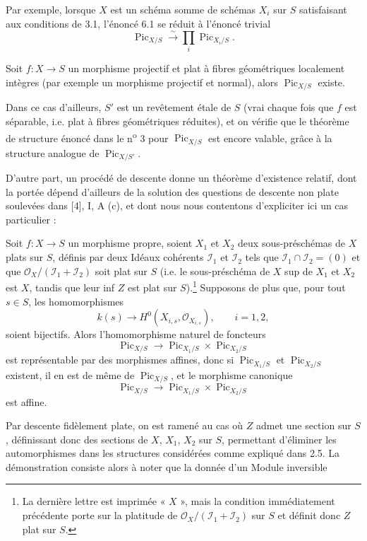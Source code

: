 Par exemple, lorsque $X$ est un schéma somme de schémas $X_i$ sur $S$
satisfaisant aux conditions de 3.1, l'énoncé 6.1 se réduit à l'énoncé trivial
\[
\operatorname{Pic}_{X/S}\xrightarrow{\sim}
\prod_i\operatorname{Pic}_{X_i/S}.
\]

 Soit $f:X\longrightarrow S$ un morphisme projectif et
plat à fibres géométriques localement intègres (par exemple un morphisme
projectif et normal), alors $\operatorname{Pic}_{X/S}$ existe.

Dans ce cas d'ailleurs, $S'$ est un revêtement étale de $S$ (vrai chaque fois
que $f$ est séparable, i.e. plat à fibres géométriques réduites), et on vérifie
que le théorème de structure énoncé dans le n\textsuperscript{o} 3 pour
$\operatorname{Pic}_{X/S}$ est encore valable, grâce à la structure analogue
de $\operatorname{Pic}_{X/S'}$.

D'autre part, un procédé de descente donne un théorème d'existence relatif,
dont la portée dépend d'ailleurs de la solution des questions de descente non
plate soulevées dans [4], I, A (c), et dont nous nous contentons d'expliciter
ici un cas particulier :

 Soit $f:X\longrightarrow S$ un morphisme propre,
soient $X_1$ et $X_2$ deux sous-préschémas de $X$ plats sur $S$, définis par
deux Idéaux cohérents $\mathcal I_1$ et $\mathcal I_2$ tels que
$\mathcal I_1\cap\mathcal I_2=(0)$ et que
$\mathcal O_X/(\mathcal I_1+\mathcal I_2)$ soit plat sur $S$ (i.e. le
sous-préschéma de $X$ sup de $X_1$ et $X_2$ est $X$, tandis que leur inf $Z$
est plat sur $S$).\footnote{La dernière lettre est imprimée « $X$ », mais la
condition immédiatement précédente porte sur la platitude de
$\mathcal O_X/(\mathcal I_1+\mathcal I_2)$ sur $S$ et définit donc $Z$ plat
sur $S$.} Supposons de plus que, pour tout $s\in S$, les homomorphismes
\[
k(s)\longrightarrow H^0(X_{i,s},\mathcal O_{X_{i,s}}),\qquad i=1,2,
\]
soient bijectifs. Alors l'homomorphisme naturel de foncteurs
\[
\operatorname{Pic}_{X/S}\longrightarrow
\operatorname{Pic}_{X_1/S}\times\operatorname{Pic}_{X_2/S}
\]
est représentable par des morphismes affines, donc si
$\operatorname{Pic}_{X_1/S}$ et $\operatorname{Pic}_{X_2/S}$ existent, il en
est de même de $\operatorname{Pic}_{X/S}$, et le morphisme canonique
\[
\operatorname{Pic}_{X/S}\longrightarrow
\operatorname{Pic}_{X_1/S}\times\operatorname{Pic}_{X_2/S}
\]
est affine.

Par descente fidèlement plate, on est ramené au cas où $Z$ admet une section
sur $S$, définissant donc des sections de $X$, $X_1$, $X_2$ sur $S$,
permettant d'éliminer les automorphismes dans les structures considérées comme
expliqué dans 2.5. La démonstration consiste alors à noter que la donnée d'un
Module inversible

